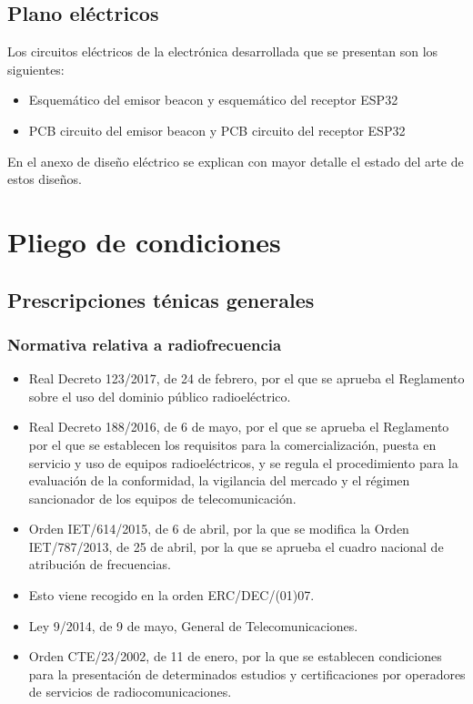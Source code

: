 \documentclass[a4paper ,12pt, onecolumn]{article}
\begin{document}
    \subsection{Plano eléctricos}
        Los circuitos eléctricos de la electrónica desarrollada que se presentan son los siguientes:
        \begin{itemize}
            \item Esquemático del emisor beacon y esquemático del receptor ESP32
            \item PCB circuito del emisor beacon y PCB circuito del receptor ESP32
        \end{itemize}
        En el anexo de diseño eléctrico se explican con mayor detalle el estado del arte de estos diseños.
\section{Pliego de condiciones}
    \subsection{Prescripciones ténicas generales}
        \subsubsection{Normativa relativa a radiofrecuencia}
            \begin{itemize}
                \item Real Decreto 123/2017, de 24 de febrero, por el que se aprueba el Reglamento
                sobre el uso del dominio público radioeléctrico.
                \item Real Decreto 188/2016, de 6 de mayo, por el que se aprueba el Reglamento 
                por el que se establecen los requisitos para la comercialización, puesta en servicio 
                y uso de equipos radioeléctricos, y se regula el procedimiento para la evaluación de
                la conformidad, la vigilancia del mercado y el régimen sancionador de los equipos de
                telecomunicación.
                \item Orden IET/614/2015, de 6 de abril, por la que se modifica la Orden IET/787/2013,
                de 25 de abril, por la que se aprueba el cuadro nacional de atribución de frecuencias.
                \item Esto viene recogido en la orden ERC/DEC/(01)07.
                \item Ley 9/2014, de 9 de mayo, General de Telecomunicaciones.
                \item Orden CTE/23/2002, de 11 de enero, por la que se establecen condiciones para la presentación de determinados
                estudios y certificaciones por operadores de servicios de radiocomunicaciones. 
            \end{itemize}
\end{document}
